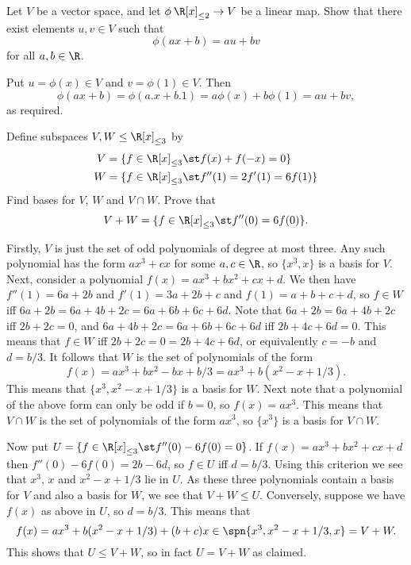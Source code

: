 \begin{exercise}\label{ex-maps-from-quad}
 Let $V$ be a vector space, and let
 $\phi\:\R[x]_{\leq 2}\to V$ be a linear map.  Show that
 there exist elements $u,v\in V$ such that 
 \[ \phi(a x + b) = au + bv \]
 for all $a,b\in\R$. 
\end{exercise}
\begin{solution}
 Put $u=\phi(x)\in V$ and $v=\phi(1)\in V$.  Then
 \[ \phi(ax+b) = \phi(a.x+b.1) = a\phi(x)+b\phi(1)
     = au+bv,
 \]
 as required. 
\end{solution}

\begin{exercise}\label{ex-two-subspaces}
 Define subspaces $V,W\leq\R[x]_{\leq 3}$ by 
 \begin{align*}
  V &= \{f\in\R[x]_{\leq 3}\st f(x)+f(-x)=0\} \\
  W &= \{f\in\R[x]_{\leq 3}\st f''(1)=2f'(1)=6f(1)\}
 \end{align*}
 Find bases for $V$, $W$ and $V\cap W$.  Prove that
 \[ V+W = \{f\in\R[x]_{\leq 3}\st f''(0)=6f(0)\}. \]
\end{exercise}
\begin{solution}
 Firstly, $V$ is just the set of odd polynomials of degree
 at most three.  Any such polynomial has the form $ax^3+cx$
 for some $a,c\in\R$, so $\{x^3,x\}$ is a basis for $V$. 
 Next, consider a polynomial $f(x)=ax^3+bx^2+cx+d$.  We then
 have $f''(1)=6a+2b$ and $f'(1)=3a+2b+c$ and $f(1)=a+b+c+d$,
 so $f\in W$ iff $6a+2b=6a+4b+2c=6a+6b+6c+6d$.  Note that
 $6a+2b=6a+4b+2c$ iff $2b+2c=0$, and $6a+4b+2c=6a+6b+6c+6d$
 iff $2b+4c+6d=0$.  This means that $f\in W$ iff
 $2b+2c=0=2b+4c+6d$, or equivalently $c=-b$ and $d=b/3$.  It
 follows that $W$ is the set of polynomials of the form
 \[ f(x) = ax^3 + b x^2 - b x + b/3 = 
     a x^3 + b(x^2-x+1/3). 
 \]
 This means that $\{x^3,x^2-x+1/3\}$ is a basis for $W$. 
 Next note that a polynomial of the above form can only be
 odd if $b=0$, so $f(x)=ax^3$.  This means that $V\cap W$ is
 the set of polynomials of the form $ax^3$, so $\{x^3\}$ is
 a basis for $V\cap W$. 

 Now put $U=\{f\in\R[x]_{\leq 3}\st f''(0)-6f(0)=0\}$.  If
 $f(x)=ax^3+bx^2+cx+d$ then $f''(0)-6f(0)=2b-6d$, so
 $f\in U$ iff $d=b/3$.  Using this criterion we see that
 $x^3$, $x$  and $x^2-x+1/3$ lie in $U$.  As these three
 polynomials contain a basis for $V$ and also a basis for
 $W$, we see that $V+W\leq U$.  Conversely, suppose we have
 $f(x)$ as above in $U$, so $d=b/3$.  This means that
 \[ f(x) = ax^3 + b(x^2-x+1/3) + (b+c)x \in
      \spn\{x^3,x^2-x+1/3,x\} = V+W. 
 \]
 This shows that $U\leq V+W$, so in fact $U=V+W$ as claimed. 
\end{solution}


